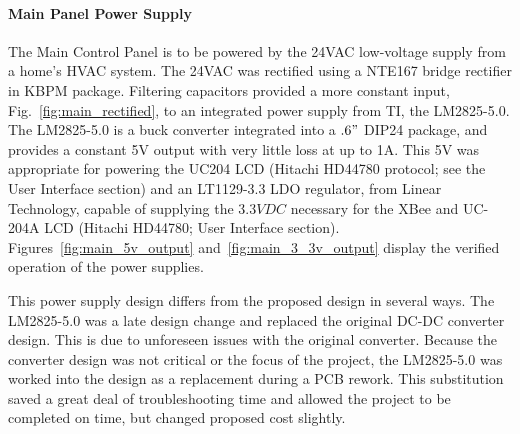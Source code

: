 \paragraph{Main Panel Power Supply}
The Main Control Panel is to be powered by the 24VAC low-voltage supply from a home's HVAC system. The 24VAC was rectified using a NTE167 bridge rectifier in KBPM package.  Filtering capacitors provided a more constant input, Fig.~\ref{fig:main_rectified}, to an integrated power supply from TI, the LM2825-5.0.  The LM2825-5.0 is a buck converter integrated into a $.6"$ DIP24 package, and provides a constant 5V output with very little loss at up to 1A.  This 5V was appropriate for powering the UC204 LCD (Hitachi HD44780 protocol; see the User Interface section) and an LT1129-3.3 LDO regulator, from Linear Technology, capable of supplying the $3.3VDC$ necessary for the XBee and UC-204A LCD (Hitachi HD44780; User Interface section). Figures~\ref{fig:main_5v_output} and~\ref{fig:main_3_3v_output} display the verified operation of the power supplies.

This power supply design differs from the proposed design in several ways.  The LM2825-5.0 was a late design change and replaced the original DC-DC converter design.  This is due to unforeseen issues with the original converter.  Because the converter design was not critical or the focus of the project, the LM2825-5.0 was worked into the design as a replacement during a PCB rework.  This substitution saved a great deal of troubleshooting time and allowed the project to be completed on time, but changed proposed cost slightly.

